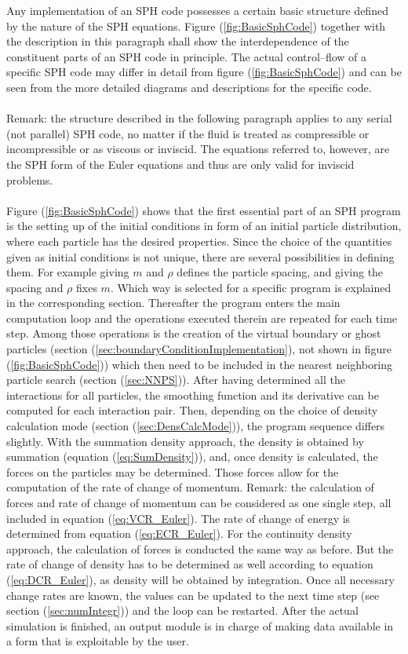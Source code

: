 \documentclass[11pt,a4paper,twoside]{report}
\begin{document}
Any implementation of an SPH code possesses a certain basic structure defined by the nature of the SPH equations. Figure (\ref{fig:BasicSphCode}) together with the description in this paragraph shall show the interdependence of the constituent parts of an SPH code in principle. The actual control--flow of a specific SPH code may differ in detail from figure (\ref{fig:BasicSphCode}) and can be seen from the more detailed diagrams and descriptions for the specific code.\\
\\
\indent
Remark: the structure described in the following paragraph applies to any serial (not parallel) SPH code, no matter if the fluid is treated as compressible or incompressible or as viscous or inviscid. The equations referred to, however, are the SPH form of the Euler equations and thus are only valid for inviscid problems.\\
\\
\indent
Figure (\ref{fig:BasicSphCode}) shows that the first essential part of an SPH program is the setting up of the initial conditions in form of an initial particle distribution, where each particle has the desired properties.
Since the choice of the quantities given as initial conditions is not unique, there are several possibilities in defining them. For example giving $m$ and $\rho$ defines the particle spacing, and giving the spacing and $\rho$ fixes $m$. Which way is selected for a specific program is explained in the corresponding section. Thereafter the program enters the main computation loop and the operations executed therein are repeated for each time step. Among those operations is the creation of the virtual boundary or ghost particles (section (\ref{sec:boundaryConditionImplementation}), not shown in figure (\ref{fig:BasicSphCode})) which then need to be included in the nearest neighboring particle search (section (\ref{sec:NNPS})). After having determined all the interactions for all particles, the smoothing function and its derivative can be computed for each interaction pair. Then, depending on the 
choice of density calculation mode (section (\ref{sec:DensCalcMode})), the program sequence differs slightly. With the summation density approach, the density is obtained by summation (equation (\ref{eq:SumDensity})), and, once density is calculated, the forces on the particles may be determined. Those forces allow for the computation of the rate of change of momentum. Remark: the calculation of forces and rate of change of momentum can be considered as one single step, all included in equation (\ref{eq:VCR_Euler}). The rate of change of energy is determined from equation (\ref{eq:ECR_Euler}).
For the continuity density approach, the calculation of forces is conducted the same way as before. But the rate of change of density 
has to be determined as well according to equation (\ref{eq:DCR_Euler}), as density will be obtained by integration. 
Once all necessary change rates are known, the values can be updated to the next time step (see section (\ref{sec:numIntegr})) and the loop can be restarted. After the actual simulation is finished, an output module is in charge of making data available in a form that is exploitable by the user.
\end{document}
